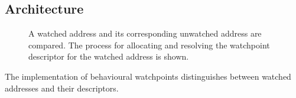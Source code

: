 \documentclass[letterpaper,twocolumn,10pt]{article}
\let\ORIGcaption\caption
\renewcommand{\caption}[2][\compressedcaption]{%
\def\compressedcaption{#2}%
    \vspace{-12pt}%
    \ORIGcaption[#1]{#2}}
\begin{document}



%


\subsection{Architecture}

\begin{figure}
\begin{center}
\end{center}
\caption{\label{fig:watchpoint_descriptor_table}A watched address and its corresponding unwatched address are compared. The process for allocating and resolving the watchpoint descriptor for the watched address is shown.}
\end{figure}

The implementation of behavioural watchpoints distinguishes between watched addresses and their descriptors.
\end{document}
